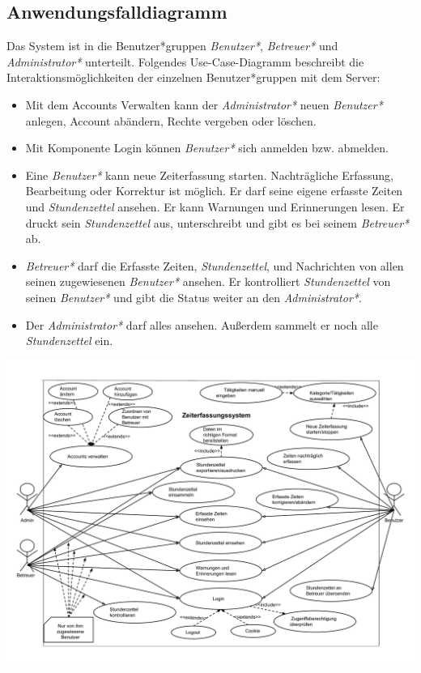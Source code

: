 \newpage
\subsection{Anwendungsfalldiagramm}
Das System ist in die Benutzer*gruppen \emph{Benutzer*}, \emph{Betreuer*} und \emph{Administrator*} unterteilt. Folgendes Use-Case-Diagramm beschreibt die Interaktionsmöglichkeiten der einzelnen Benutzer*gruppen mit dem Server:
\begin{itemize}
	\item Mit dem Accounts Verwalten kann der \emph{Administrator*} neuen \emph{Benutzer*} anlegen, Account abändern, Rechte vergeben oder löschen.
	\item Mit Komponente Login können \emph{Benutzer*} sich anmelden bzw. abmelden.
	\item Eine \emph{Benutzer*} kann neue Zeiterfassung starten. Nachträgliche Erfassung, Bearbeitung oder Korrektur ist möglich. Er darf seine eigene erfasste Zeiten und \emph{Stundenzettel} ansehen. Er kann Warnungen und Erinnerungen lesen. Er druckt sein \emph{Stundenzettel} aus, unterschreibt und gibt es bei seinem \emph{Betreuer*} ab.
	\item \emph{Betreuer*} darf die Erfasste Zeiten, \emph{Stundenzettel}, und Nachrichten von allen seinen zugewiesenen \emph{Benutzer*} ansehen. Er kontrolliert \emph{Stundenzettel} von seinen \emph{Benutzer*} und gibt die Status weiter an den \emph{Administrator*}.
	\item Der \emph{Administrator*} darf alles ansehen. Außerdem sammelt er noch alle \emph{Stundenzettel} ein.
\end{itemize}


\includegraphics[width=\linewidth]{Anwendungsfalldiagramm.pdf}\\
